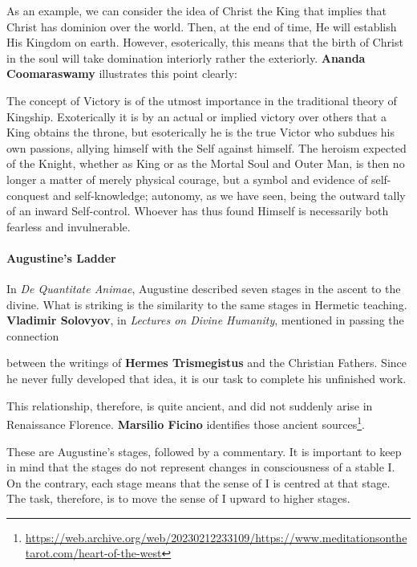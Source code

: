 As an example, we can consider the idea of Christ the King that implies that Christ has dominion over the world. Then, at the end of time, He will establish His Kingdom on earth. However, esoterically, this means that the birth of Christ in the soul will take domination interiorly rather the exteriorly. \textbf{Ananda Coomaraswamy} illustrates this point clearly:

\begin{quotex}
The concept of Victory is of the utmost importance in the traditional theory of Kingship. Exoterically it is by an actual or implied victory over others that a King obtains the throne, but esoterically he is the true Victor who subdues his own passions, allying himself with the Self against himself. The heroism expected of the Knight, whether as King or as the Mortal Soul and Outer Man, is then no longer a matter of merely physical courage, but a symbol and evidence of self-conquest and self-knowledge; autonomy, as we have seen, being the outward tally of an inward Self-control. Whoever has thus found Himself is necessarily both fearless and invulnerable.
\end{quotex}


\paragraph{Augustine's Ladder}


In \emph{De Quantitate Animae}, Augustine described seven stages in the ascent to the divine. What is striking is the similarity to the same stages in Hermetic teaching. \textbf{Vladimir Solovyov}, in
\emph{Lectures on Divine Humanity}, mentioned in passing the connection

between the writings of \textbf{Hermes Trismegistus} and the Christian Fathers. Since he never fully developed that idea, it is our task to complete his unfinished work.

This relationship, therefore, is quite ancient, and did not suddenly arise in Renaissance Florence. \textbf{Marsilio Ficino} identifies those ancient sources\footnote{\url{https://web.archive.org/web/20230212233109/https://www.meditationsonthetarot.com/heart-of-the-west}}.

These are Augustine's stages, followed by a commentary. It is important to keep in mind that the stages do not represent changes in consciousness of a stable I. On the contrary, each stage means that the sense of I is centred at that stage. The task, therefore, is to move the sense of I upward to higher stages.

